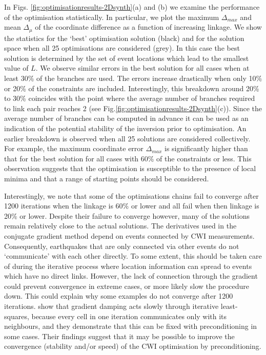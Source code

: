 \documentclass[extra]{gji}
\begin{document}
In Figs. \ref{fig:optimisationresults-2Dsynth}(a) and (b) we examine the performance of the optimisation statistically. In particular,
we plot the maximum $\Delta_{max}$ and mean $\Delta_\mu$ of the coordinate difference as a function of increasing linkage.
We show the statistics for the `best' optimisation solution (black) and for the solution space
when all 25 optimisations are considered (grey). In this case the best solution is determined
by the set of event locations which lead to the smallest value of $L$.
We observe similar errors in the best solution for all cases when at least 30\% of the
branches are used. The errors increase drastically when only 10\% or 20\% of the constraints are included.
Interestingly, this breakdown around 20\% to 30\% coincides with the point where the average number of branches
required to link each pair reaches 2 (see Fig.\ref{fig:optimisationresults-2Dsynth}(c)). Since the average number of branches can be computed
in advance it can be used as an indication of the potential stability of the inversion prior
to optimisation. An earlier breakdown is observed when all 25 solutions
are considered collectively. For example, the
maximum coordinate error $\Delta_{max}$ is significantly higher than that for the best solution for all
cases with 60\% of the constraints or less. This observation suggests that
the optimisation is susceptible to the presence of local minima and that a range of starting points
should be considered.

Interestingly, we note that some of the optimisations chains
fail to converge after 1200 iterations when the linkage is 60\% or lower and all
fail when then linkage is 20\% or lower. Despite their failure to converge however, many of the
solutions remain relatively close to the actual solutions. The derivatives used in the conjugate gradient method
depend on events connected by CWI measurements. Consequently,
earthquakes that are only connected via other events do not `communicate' with each other
directly. To some extent, this should be taken care of during the iterative process where location information
can spread to events which have no direct links. However, the
lack of connection through the gradient could prevent convergence in extreme cases, or more likely
slow the procedure down. This could explain why some
examples do not converge after 1200 iterations.
\citet{dr_VanDecar94a} show that gradient damping acts
slowly through iterative least-squares, because
 every cell in one iteration communicates only with its neighbours, and they demonstrate that this can be
fixed with preconditioning in some cases. Their findings suggest that it may be possible to improve
the convergence (stability and/or speed) of the CWI optimisation by preconditioning.
\end{document}
